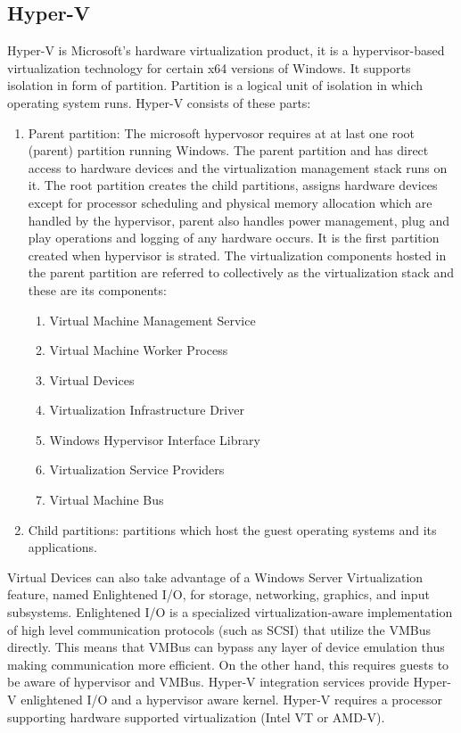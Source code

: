 \begin{enumerate}
\subsection{Hyper-V}
Hyper-V is Microsoft's hardware virtualization product, it is a hypervisor-based virtualization technology for certain x64 versions of Windows. It supports isolation in form of partition. Partition is a logical unit of isolation in which operating system runs. 
Hyper-V consists of these parts:
\begin{enumerate}
\item Parent partition: The microsoft hypervosor requires at at last one root (parent) partition running Windows. The parent partition and has direct access to hardware devices and the virtualization management stack runs on it. The root partition creates the child partitions, assigns hardware devices except for processor scheduling and physical memory allocation which are handled by the hypervisor, parent also handles power management, plug and play operations and logging of any hardware occurs. It is the first partition created when hypervisor is strated. The virtualization components hosted in the parent partition are referred to collectively as the virtualization stack and these are its components:
\begin{enumerate}
\item Virtual Machine Management Service
\item Virtual Machine Worker Process
\item Virtual Devices
\item Virtualization Infrastructure Driver
\item Windows Hypervisor Interface Library
\item Virtualization Service Providers
\item Virtual Machine Bus
\end{enumerate}
\item Child partitions: partitions which host the guest operating systems and its applications.
\end{enumerate}
Virtual Devices can also take advantage of a Windows Server Virtualization feature, named Enlightened I/O, for storage, networking, graphics, and input subsystems. Enlightened I/O is a specialized virtualization-aware implementation of high level communication protocols (such as SCSI) that utilize the VMBus directly. This means that VMBus can bypass any layer of device emulation thus making communication more efficient. On the other hand, this requires guests to be aware of hypervisor and VMBus. Hyper-V integration services provide Hyper-V enlightened I/O and a hypervisor aware kernel. Hyper-V requires a processor supporting hardware supported virtualization (Intel VT or AMD-V).

\end{enumerate}
